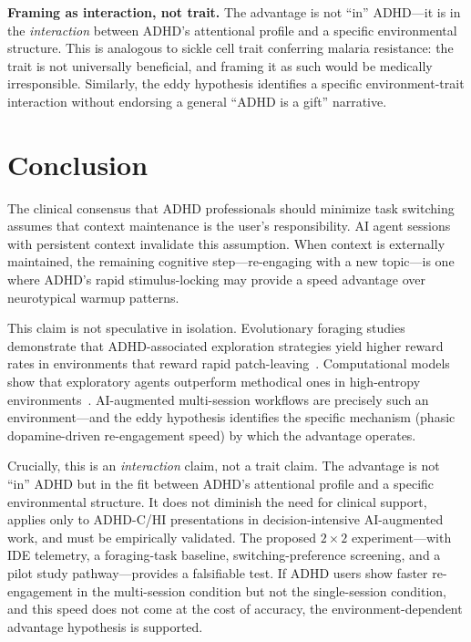 \documentclass[sigconf,nonacm]{acmart}
\begin{document}
\textbf{Framing as interaction, not trait.} The advantage is not ``in'' ADHD---it is in the \emph{interaction} between ADHD's attentional profile and a specific environmental structure. This is analogous to sickle cell trait conferring malaria resistance: the trait is not universally beneficial, and framing it as such would be medically irresponsible. Similarly, the eddy hypothesis identifies a specific environment-trait interaction without endorsing a general ``ADHD is a gift'' narrative.

\section{Conclusion}

The clinical consensus that ADHD professionals should minimize task switching assumes that context maintenance is the user's responsibility. AI agent sessions with persistent context invalidate this assumption. When context is externally maintained, the remaining cognitive step---re-engaging with a new topic---is one where ADHD's rapid stimulus-locking may provide a speed advantage over neurotypical warmup patterns.

This claim is not speculative in isolation. Evolutionary foraging studies demonstrate that ADHD-associated exploration strategies yield higher reward rates in environments that reward rapid patch-leaving~\cite{barack2024}. Computational models show that exploratory agents outperform methodical ones in high-entropy environments~\cite{meredith2025}. AI-augmented multi-session workflows are precisely such an environment---and the eddy hypothesis identifies the specific mechanism (phasic dopamine-driven re-engagement speed) by which the advantage operates.

Crucially, this is an \emph{interaction} claim, not a trait claim. The advantage is not ``in'' ADHD but in the fit between ADHD's attentional profile and a specific environmental structure. It does not diminish the need for clinical support, applies only to ADHD-C/HI presentations in decision-intensive AI-augmented work, and must be empirically validated. The proposed $2 \times 2$ experiment---with IDE telemetry, a foraging-task baseline, switching-preference screening, and a pilot study pathway---provides a falsifiable test. If ADHD users show faster re-engagement in the multi-session condition but not the single-session condition, and this speed does not come at the cost of accuracy, the environment-dependent advantage hypothesis is supported.
\end{document}
